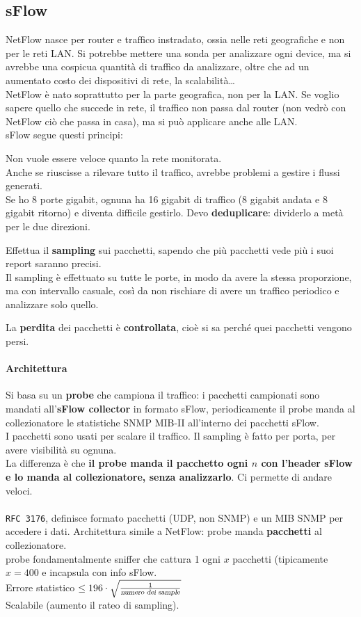 \documentclass[10pt]{book}
\begin{document}
\subsection{sFlow}
NetFlow nasce per router e traffico instradato, ossia nelle reti geografiche e non per le reti LAN. Si potrebbe mettere una sonda per analizzare ogni device, ma si avrebbe una cospicua quantità di traffico da analizzare, oltre che ad un aumentato costo dei dispositivi di rete, la scalabilità\ldots\\
NetFlow è nato soprattutto per la parte geografica, non per la LAN. Se voglio sapere quello che succede in rete, il traffico non passa dal router (non vedrò con NetFlow ciò che passa in casa), ma si può applicare anche alle LAN.\\
sFlow segue questi principi:
\begin{list}{}{}
	\item Non vuole essere veloce quanto la rete monitorata.\\
	Anche se riuscisse a rilevare tutto il traffico, avrebbe problemi a gestire i flussi generati.\\
	Se ho 8 porte gigabit, ognuna ha 16 gigabit di traffico (8 gigabit andata e 8 gigabit ritorno) e diventa difficile gestirlo. Devo \textbf{deduplicare}: dividerlo a metà per le due direzioni.
	\item Effettua il \textbf{sampling} sui pacchetti, sapendo che più pacchetti vede più i suoi report saranno precisi.\\
	Il sampling è effettuato su tutte le porte, in modo da avere la stessa proporzione, ma con intervallo casuale, così da non rischiare di avere un traffico periodico e analizzare solo quello.
	\item La \textbf{perdita} dei pacchetti è \textbf{controllata}, cioè si sa perché quei pacchetti vengono persi.
\end{list}
\paragraph{Architettura} Si basa su un \textbf{probe} che campiona il traffico: i pacchetti campionati sono mandati all'\textbf{sFlow collector} in formato sFlow, periodicamente il probe manda al collezionatore le statistiche SNMP MIB-II all'interno dei pacchetti sFlow.\\
I pacchetti sono usati per scalare il traffico. Il sampling è fatto per porta, per avere visibilità su ognuna.\\
La differenza è che \textbf{il probe manda il pacchetto ogni $n$ con l'header sFlow e lo manda al collezionatore, senza analizzarlo}. Ci permette di andare veloci.\\\\
\texttt{RFC 3176}, definisce formato pacchetti (UDP, non SNMP) e un MIB SNMP per accedere i dati. Architettura simile a NetFlow: probe manda \textbf{pacchetti} al collezionatore.\\
probe fondamentalmente sniffer che cattura 1 ogni $x$ pacchetti (tipicamente $x = 400$ e incapsula con info sFlow.\\
Errore statistico $\leq 196\cdot\sqrt{\frac{1}{\textsl{numero dei sample}}}$\\
Scalabile (aumento il rateo di sampling).
\end{document}
